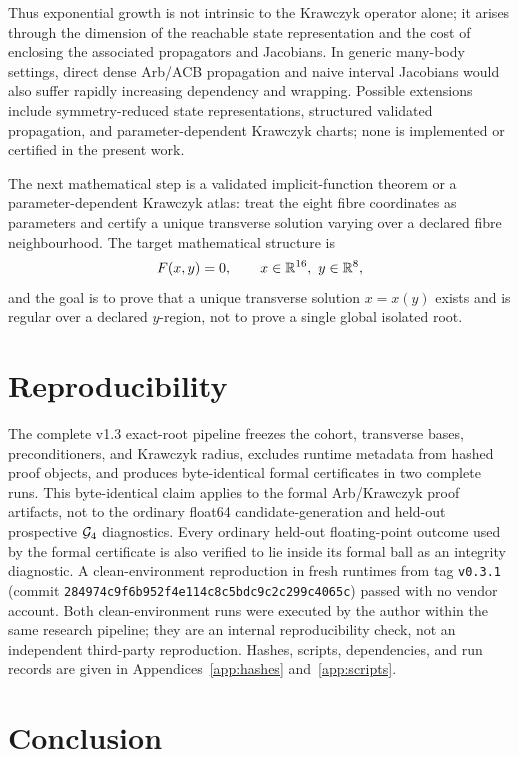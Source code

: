 Thus exponential growth is not intrinsic to the Krawczyk operator alone; it arises through
the dimension of the reachable state representation and the cost of enclosing the
associated propagators and Jacobians. In generic many-body settings, direct dense Arb/ACB
propagation and naive interval Jacobians would also suffer rapidly increasing dependency
and wrapping. Possible extensions include symmetry-reduced state representations,
structured validated propagation, and parameter-dependent Krawczyk charts; none is
implemented or certified in the present work.

The next mathematical step is a validated implicit-function theorem or a
parameter-dependent Krawczyk atlas: treat the eight fibre coordinates as parameters and
certify a unique transverse solution varying over a declared fibre neighbourhood. The
target mathematical structure is
\[
F(x,y)=0,\qquad x\in\Rr^{16},\ y\in\Rr^{8},
\]
and the goal is to prove that a unique transverse solution $x=x(y)$ exists and is regular
over a declared $y$-region, not to prove a single global isolated root.

\section{Reproducibility}\label{sec:repro}

The complete v1.3 exact-root pipeline freezes the cohort, transverse bases,
preconditioners, and Krawczyk radius, excludes runtime metadata from hashed proof objects,
and produces byte-identical formal certificates in two complete runs. This byte-identical
claim applies to the formal Arb/Krawczyk proof artifacts, not to the ordinary float64
candidate-generation and held-out prospective $\mathcal{G}_{4}$ diagnostics. Every ordinary
held-out floating-point outcome used by the formal certificate is also verified to lie
inside its formal ball as an integrity diagnostic. A clean-environment reproduction in
fresh runtimes from tag \texttt{v0.3.1} (commit
\texttt{284974c9f6b952f4e114c8c5bdc9c2c299c4065c}) passed with no vendor account. Both
clean-environment runs were executed by the author within the same research pipeline; they
are an internal reproducibility check, not an independent third-party reproduction. Hashes,
scripts, dependencies, and run records are given in Appendices~\ref{app:hashes}
and~\ref{app:scripts}.

\section{Conclusion}\label{sec:conclusion}

